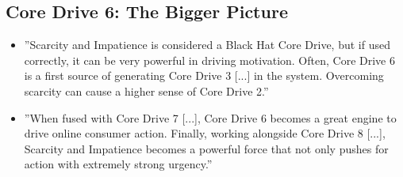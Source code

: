\subsection{Core Drive 6: The Bigger Picture}
\begin{itemize}
    \item ''Scarcity and Impatience is considered a Black Hat Core Drive, but if used correctly, it can be very powerful in driving motivation. Often, Core Drive 6 is a first source of generating Core Drive 3 [...] in the system. Overcoming scarcity can cause a higher sense of Core Drive 2.''
    \item ''When fused with Core Drive 7 [...], Core Drive 6 becomes a great engine to drive online consumer action. Finally, working alongside Core Drive 8 [...], Scarcity and Impatience becomes a powerful force that not only pushes for action with extremely strong urgency.''
\end{itemize}